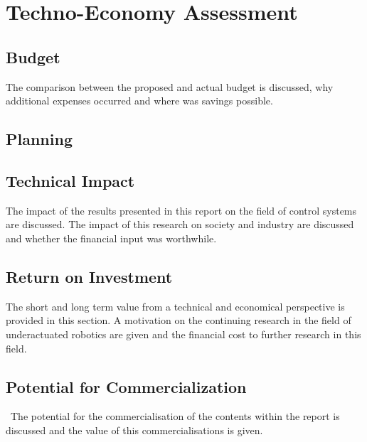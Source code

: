 \newpage



%

\section{Techno-Economy Assessment}

\subsection{Budget}
The comparison between the proposed and actual budget is discussed, why additional expenses occurred and where was savings possible.  


\subsection{Planning}
\subsection{Technical Impact}
The impact of the results presented in this report on the field of control systems are discussed. The impact of this research on society and industry are discussed and whether the financial input was worthwhile.\\


\subsection{Return on Investment}
The short and long term value from a technical and economical perspective is provided in this section. A motivation on the continuing research in the field of underactuated robotics are given and the financial cost to further research in this field.\\


\subsection{Potential for Commercialization}\
The potential for the commercialisation of the contents within the report is discussed and the value of this commercialisations is given. 




